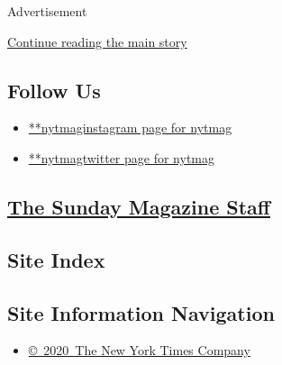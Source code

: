 Advertisement

\protect\hyperlink{after-mktg}{Continue reading the main story}

\hypertarget{follow-us}{%
\subsection{Follow Us}\label{follow-us}}

\begin{itemize}
\tightlist
\item
  \href{https://instagram.com/nytmag}{**nytmaginstagram page for nytmag}
\item
  \href{https://twitter.com/nytmag}{**nytmagtwitter page for nytmag}
\end{itemize}

\subsection{}

\hypertarget{the-sunday-magazine-staff}{%
\subsection{\texorpdfstring{\href{\%0Ahttps://www.nytimes.com/interactive/magazine/masthead.html}{The
Sunday Magazine
Staff}}{The Sunday Magazine Staff}}\label{the-sunday-magazine-staff}}

\hypertarget{site-index}{%
\subsection{Site Index}\label{site-index}}

\hypertarget{site-information-navigation}{%
\subsection{Site Information
Navigation}\label{site-information-navigation}}

\begin{itemize}
\tightlist
\item
  \href{https://help.nytimes.com/hc/en-us/articles/115014792127-Copyright-notice}{©~2020~The
  New York Times Company}
\end{itemize}

